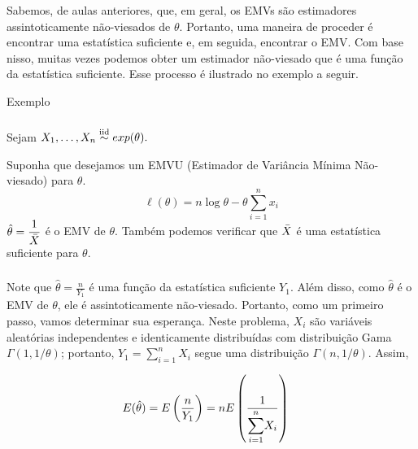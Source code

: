 \documentclass[12pt]{beamer}
\begin{document}
\begin{frame}{}
\frametitle{}
\begin{block}{}
\justifying
Sabemos, de aulas anteriores, que, em geral, os EMVs são estimadores assintoticamente não-viesados de $\theta$. Portanto, uma maneira de proceder é encontrar uma estatística suficiente e, em seguida, encontrar o EMV. Com base nisso, muitas vezes podemos obter um estimador não-viesado que é uma função da estatística suficiente. Esse processo é ilustrado no exemplo a seguir.
\end{block}
\end{frame}

\begin{frame}{Exemplo}
\frametitle{}
\begin{block}{}
\justifying
Sejam $X_1, \ldots, X_n\overset{\text{iid}}{\sim} exp(\theta).$

Suponha que desejamos um EMVU (Estimador de Variância Mínima Não-viesado) para $\theta$. 
\begin{equation}
\ell(\theta) = n \log \theta - \theta \sum_{i=1}^n x_i
\end{equation}
$\hat{\theta}=\dfrac{1}{\Bar{X}}$ é o EMV de $\theta.$ Também podemos verificar que $\Bar{X}$ é uma estatística suficiente para $\theta.$ 
\end{block}
\end{frame}

\begin{frame}{}
\frametitle{}
\begin{block}{}
\justifying
Note que $\hat{\theta} = \frac{n}{Y_1}$ é uma função da estatística suficiente $Y_1$. Além disso, como $\hat{\theta}$ é o EMV de $\theta$, ele é assintoticamente não-viesado. Portanto, como um primeiro passo, vamos determinar sua esperança. Neste problema, $X_i$ são variáveis aleatórias independentes e identicamente distribuídas com distribuição Gama $\Gamma(1, 1/\theta)$; portanto, $Y_1 = \sum_{i=1}^n X_i$ segue uma distribuição $\Gamma(n, 1/\theta)$. Assim,

\begin{align*}
E(\hat{\theta}) &= E\left(\frac{n}{Y_1}\right)= n E\left(\frac{1}{{\displaystyle \sum_{i=1}^{n}} X_{i}}\right) 
\end{align*}
\end{block}
\end{frame}
\end{document}
